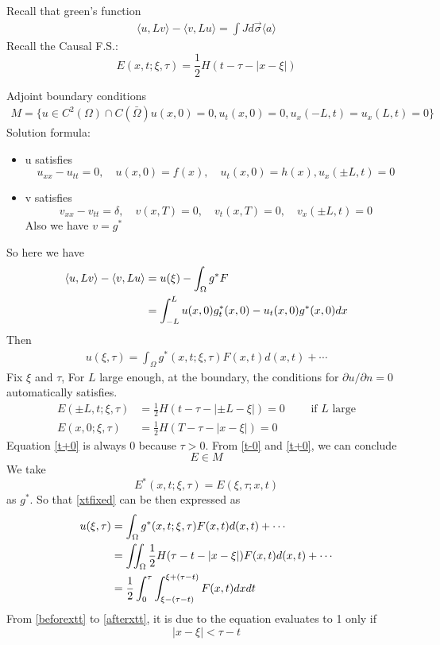 \documentclass{article}
\newcommand{\Sangle}[1]{\langle {#1} \rangle}
\numberwithin{equation}{section}
\newcommand{\<}{\langle}
\begin{document}
\begin{tcolorbox}
Recall that green's function 
\begin{align}
	\langle u,Lv \rangle- \langle v,Lu \rangle = \int Jd \vec\sigma  
	\Sangle{a}
\end{align}
Recall the Causal F.S.:
\begin{equation}
	E(x,t;\xi,\tau) = \frac{1}{2}H(t - \tau- |x- \xi|)
\end{equation}
\end{tcolorbox}

Adjoint boundary conditions
\begin{align}
	M= \{ u \in C^2 (\Omega) \cap C(\bar\Omega) u(x,0) = 0, u_t(x,0) =0, u_x(-L,t) = u_x(L,t) = 0\}
\end{align}
Solution formula:
\begin{itemize}
	\item u satisfies
	\begin{equation}
		u_{xx}-u_{tt} = 0, \quad u(x,0) = f(x), \quad u_t(x,0) =h(x), u_x(\pm L,t) = 0
	\end{equation}
	\item v satisfies
	\begin{equation}
		v_{xx}-v_{tt} = \delta, \quad v(x,T) =0, \quad v_t(x,T) = 0, \quad v_x(\pm L,t) = 0
	\end{equation}
	Also we have 
	$v = g^*$
\end{itemize}
So here we have 
\begin{align}
	\Sangle{u,Lv} - \Sangle{v,Lu} &= u(\xi) - \int_\Omega g^* F \notag \\
	&= \int_{-L}^L u(x,0)g_t^*(x,0) - u_t(x,0) g^*(x,0) dx 
\end{align}
Then 
\begin{align}
	u(\xi, \tau) = \int_ \Omega g^*(x,t; \xi, \tau ) F(x,t) d(x,t) + \cdots  \label{xtfixed}
\end{align}
Fix $\xi$ and $\tau$, For $L$ large enough, at the boundary, the conditions for $\partial u/ \partial n = 0$ automatically satisfies.
\begin{align}
	E( \pm L, t; \xi, \tau) &= \frac{1}{2} H(t- \tau - |\pm L - \xi| ) = 0 \qquad \text{ if $L$ large} \label{t-0}\\
	E(x,0;\xi,\tau) &= \frac{1}{2} H(T - \tau- |x- \xi|) = 0 \label{t+0}
\end{align}
Equation \eqref{t+0} is always 0 because $\tau>0$. From \eqref{t-0} and \eqref{t+0}, we can conclude \[
	E \in M
\]
We take 
\begin{equation}
	E^*(x,t;\xi,\tau) = E(\xi,\tau;x,t)
\end{equation}
as $g^*$. So that \eqref{xtfixed} can be then expressed as
\begin{align}
	u(\xi, \tau) &= \int_ \Omega g^*(x,t; \xi, \tau ) F(x,t) d(x,t) + \cdots \notag\\
	&= \iint_\Omega \frac{1}{2} H(\tau - t - |x- \xi|) F(x,t) d(x,t) + \cdots \label{beforextt} \\
	&= \frac{1}{2} \int_0^\tau \int_{\xi-(\tau-t)}^{\xi+(\tau-t)}F(x,t) dxdt \label{afterxtt}
\end{align}
From \eqref{beforextt} to \eqref{afterxtt}, it is due to the equation evaluates to 1 only if
\[
	|x- \xi| <\tau - t
\]
\end{document}
